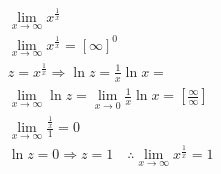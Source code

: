 \begin{ex}
\begin{align}
&\lim_{x\rightarrow \infty} x^{\frac{1}{x}}\nonumber\\
&\lim_{x\rightarrow \infty} x^{\frac{1}{x}}=[\infty]^0\nonumber\\
&z=x^{\frac{1}{x}} \Rightarrow \ln{z}=\frac{1}{x}\ln{x}=\nonumber\\
&\lim_{x\rightarrow \infty} \ln{z}=\lim_{x\rightarrow 0} \frac{1}{x}\ln{x}=\left[\frac{\infty}{\infty}\right]\nonumber\\
&\lim_{x\rightarrow \infty} \frac{\frac{1}{x}}{1}=0\nonumber\\
&\ln{z}=0 \Rightarrow z=1 \quad \therefore \lim_{x\rightarrow \infty} x^{\frac{1}{x}}=1\nonumber
\end{align}
\end{ex}
